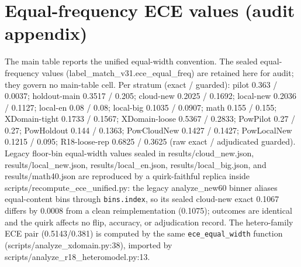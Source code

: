 \documentclass[10pt]{article} %
\begin{document}
\section{Equal-frequency ECE values (audit appendix)}
The main table reports the unified equal-width convention. The sealed equal-frequency values (label\_match\_v31.ece\_equal\_freq) are retained here for audit; they govern no main-table cell. Per stratum (exact / guarded): pilot 0.363 / 0.0037; holdout-main 0.3517 / 0.205; cloud-new 0.2025 / 0.1692; local-new 0.2036 / 0.1127; local-en 0.08 / 0.08; local-big 0.1035 / 0.0907; math 0.155 / 0.155; XDomain-tight 0.1733 / 0.1567; XDomain-loose 0.5367 / 0.2833; PowPilot 0.27 / 0.27; PowHoldout 0.144 / 0.1363; PowCloudNew 0.1427 / 0.1427; PowLocalNew 0.1215 / 0.095; R18-loose-rep 0.6825 / 0.3625 (raw exact / adjudicated guarded). Legacy floor-bin equal-width values sealed in results/cloud\_new.json, results/local\_new.json, results/local\_en.json, results/local\_big.json, and results/math40.json are reproduced by a quirk-faithful replica inside scripts/recompute\_ece\_unified.py: the legacy analyze\_new60 binner aliases equal-content bins through \texttt{bins.index}, so its sealed cloud-new exact 0.1067 differs by 0.0008 from a clean reimplementation (0.1075); outcomes are identical and the quirk affects no flip, accuracy, or adjudication record. The hetero-family ECE pair (0.5143/0.381) is computed by the same \texttt{ece\_equal\_width} function (scripts/analyze\_xdomain.py:38), imported by scripts/analyze\_r18\_heteromodel.py:13.
\end{document}
